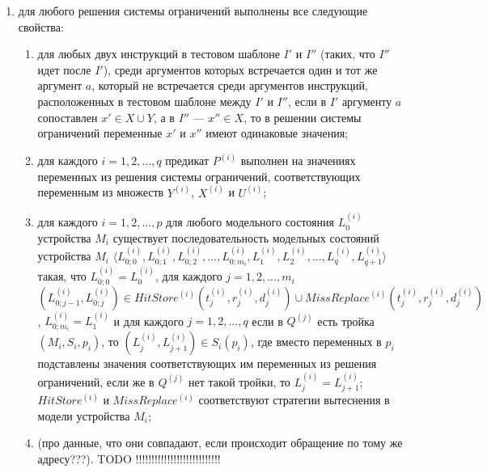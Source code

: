\begin{enumerate}
    \item для любого решения системы ограничений выполнены все следующие свойства:
        \begin{enumerate}
          \item для любых двух инструкций в тестовом шаблоне $I'$ и $I''$ (таких, что $I''$ идет после $I'$), среди аргументов которых встречается один и тот же аргумент $a$, который не встречается среди аргументов инструкций, расположенных в тестовом шаблоне между $I'$ и $I''$, если в $I'$ аргументу $a$ сопоставлен $x' \in X \cup Y$, а в $I''$ --- $x'' \in X$, то в решении системы ограничений переменные $x'$ и $x''$ имеют одинаковые значения;
          \item для каждого $i = 1, 2, ..., q$ предикат $P^{(i)}$ выполнен на значениях переменных из решения системы ограничений, соответствующих переменным из множеств $Y^{(i)}$, $X^{(i)}$ и $U^{(i)}$;
          \item для каждого $i = 1, 2, ..., p$ для любого модельного состояния $L_0^{(i)}$ устройства $M_i$ существует последовательность модельных состояний устройства $M_i$ $\langle L_{0;0}^{(i)}, L_{0;1}^{(i)}, L_{0;2}^{(i)}, ..., L_{0;m_i}^{(i)}, L_1^{(i)}, L_2^{(i)}, ..., L_q^{(i)}, L_{q+1}^{(i)} \rangle$ такая, что $L_{0;0}^{(i)} = L_0^{(i)}$, для каждого $j = 1, 2, ..., m_i$ $(L_{0;j-1}^{(i)}, L_{0;j}^{(i)}) \in HitStore^{(i)} (t_j^{(i)}, r_j^{(i)}, d_j^{(i)}) \cup MissReplace^{(i)} (t_j^{(i)}, r_j^{(i)}, d_j^{(i)})$, $L_{0;m_i}^{(i)} = L_1^{(i)}$ и для каждого $j = 1, 2, ..., q$ если в $Q^{(j)}$ есть тройка $(M_i, S_i, p_i)$, то $(L_j^{(i)}, L_{j+1}^{(i)}) \in S_i(p_i)$, где вместо переменных в $p_i$ подставлены значения соответствующих им переменных из решения ограничений, если же в $Q^{(j)}$ нет такой тройки, то $L_j^{(i)} = L_{j+1}^{(i)}$; $HitStore^{(i)}$ и $MissReplace^{(i)}$ соответствуют стратегии вытеснения в модели устройства $M_i$;
          \item (про данные, что они совпадают, если происходит обращение по тому же адресу???).   TODO !!!!!!!!!!!!!!!!!!!!!!!!!!!
        \end{enumerate}
  \end{enumerate}

